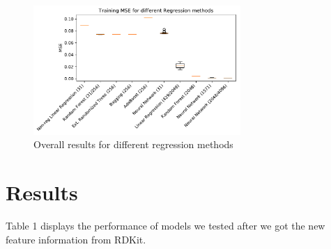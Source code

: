 \documentclass[11pt]{article}
\begin{document}
\begin{figure}[h]
\centering
\includegraphics[width=0.7\textwidth]{Results_AC.pdf}
\caption{Overall results for different regression methods}
\label{fig:his_feature_importance}
\end{figure}


\section{Results}
Table 1 displays the performance of models we tested after we got the new feature information from RDKit. 

\end{document}
